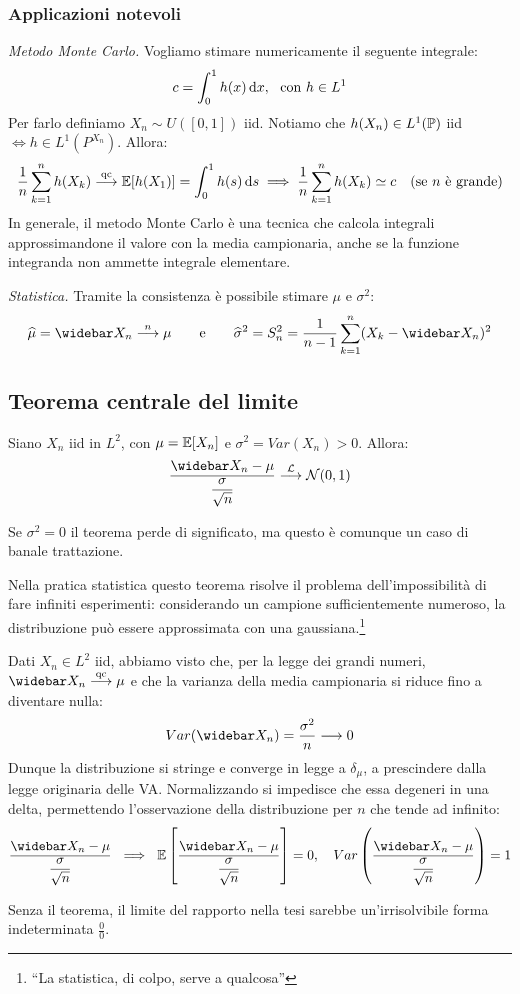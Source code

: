 \subsubsection{Applicazioni notevoli}
\emph{Metodo Monte Carlo.} Vogliamo stimare numericamente il seguente integrale:
$$c= \int_0^1 h(x) \, \mathrm d x, \ \  \text{con } h \in L^1$$
Per farlo definiamo $X_n \sim U([0,1])$ iid. Notiamo che $h(X_n) \in L^1(\mathbb P)$ iid $\iff h \in L^1(P^{X_n})$. Allora:
$$\frac{1}{n} \sum_{k=1}^{n} h(X_k) \stackrel{\text{qc}}{\longrightarrow} \mathbb E[h(X_1)]=\int_{0}^{1}h(s) \, \mathrm d s \\
\implies \frac{1}{n} \sum_{k=1}^{n}h(X_k) \simeq c \quad \text{(se $n$ è grande)}$$
In generale, il metodo Monte Carlo è una tecnica che calcola integrali approssimandone il valore con la media campionaria, anche se la funzione integranda non ammette integrale elementare.

\medskip
\emph{Statistica.} Tramite la consistenza è possibile stimare $\mu$ e $\sigma^2$:
$$\widehat{\mu}=\widebar X_n \stackrel{n}{\longrightarrow} \mu \qquad \text e \qquad \widehat{\sigma}^2= S_n^2= \dfrac{1}{n-1} \sum_{k=1}^{n}(X_k-\widebar X_n)^2$$

\subsection{Teorema centrale del limite}

\begin{teo}\label{TCL}
  Siano $X_n$ iid in $L^2$, con $\mu = \mathbb E[X_n]$ e $\sigma^2= Var(X_n)>0$. Allora:
  $$\dfrac{\widebar X_n-\mu}{ \dfrac{\sigma}{\sqrt{n} } }  \stackrel{\Lc}{\longrightarrow} \Nc(0,1)$$
\end{teo}
Se $\sigma^2=0$ il teorema perde di significato, ma questo è comunque un caso di banale trattazione.

Nella pratica statistica questo teorema risolve il problema dell'impossibilità di fare infiniti esperimenti: considerando un campione sufficientemente numeroso, la distribuzione può essere approssimata con una gaussiana.\footnote{``La statistica, di colpo, serve a qualcosa''}

\begin{nb}
  Dati $X_n \in L^2$ iid, abbiamo visto che, per la legge dei grandi numeri, $\widebar X_n \stackrel{\text{qc}}{\longrightarrow} \mu$ e che la varianza della media campionaria si riduce fino a diventare nulla:
  $$Var(\widebar X_n)=\dfrac{\sigma^2}{n} \longrightarrow 0$$
  Dunque la distribuzione si stringe e converge in legge a $\delta_{\mu}$, a prescindere dalla legge originaria delle VA.
  Normalizzando si impedisce che essa degeneri in una delta, permettendo l'osservazione della distribuzione per $n$ che tende ad infinito:
  $$ \dfrac{\widebar X_n - \mu}{\dfrac{\sigma}{\sqrt{n}}} \ \implies \
  \EE \left[ \dfrac{\widebar X_n - \mu}{\dfrac{\sigma}{\sqrt{n}}} \right] = 0, \quad
  Var \left( \dfrac{\widebar X_n - \mu}{\dfrac{\sigma}{\sqrt{n}}} \right) = 1 $$
\end{nb}
Senza il teorema, il limite del rapporto nella tesi sarebbe un'irrisolvibile forma indeterminata $\frac 0 0$.

